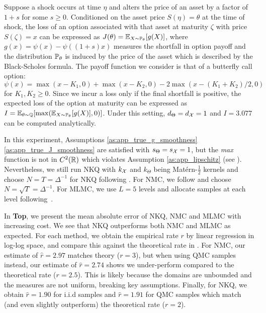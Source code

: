 Suppose a shock occurs at time $\eta$ and alters the price of an asset by a factor of $1 + s$ for some $s \geq 0$. 
Conditioned on the asset price $S(\eta)=\theta$ at the time of shock, the loss of an option associated with that asset at maturity $\zeta$ with price $S(\zeta) = x$ can be expressed as $J(\theta) = \operatorname{\mathbb{E}}_{X \sim \mathbb{P}_\theta}[g(X)]$, where $g(x) = \psi(x) - \psi((1+s)x)$ measures the shortfall in option payoff and the distribution $\mathbb{P}_\theta$ is induced by the price of the asset which is described by the Black-Scholes formula. 
The payoff function we consider is that of a butterfly call option: $\psi(x) = \max (x-K_1, 0) + \max (x - K_2, 0) - 2\max (x - (K_1 + K_2)/2, 0)$ for $K_1,K_2\geq 0$.
Since we incur a loss only if the final shortfall is positive, the expected loss of the option at maturity can be expressed as $I = \operatorname{\mathbb{E}}_{\theta \sim \mathbb{Q}} [ \max( \operatorname{\mathbb{E}}_{X \sim \mathbb{P}_\theta}[g(X)], 0) ]$. 
Under this setting, $d_\Theta=d_{\mathcal{X}}=1$ and $I= 3.077$ can be computed analytically.

In this experiment, Assumptions \ref{as:app_true_g_smoothness}\ref{as:app_true_J_smoothness} are satisfied with $s_\Theta=s_{\mathcal{X}}=1$, but the \textit{max} function is not in $C^2(\mathbb{R})$ which violates Assumption \ref{as:app_lipschitz} (see ).
Nevertheless, we still run NKQ with $k_{\mathcal{X}}$ and $k_\Theta$ being Mat\'{e}rn-$\frac{1}{2}$ kernels and choose $N=T=\Delta^{-1}$ for NKQ following .
For NMC, we follow \citet{Gordy2010} and choose $N = \sqrt{T} =\Delta^{-1}$. For MLMC, we use $L=5$ levels and allocate samples at each level following~\citet{giles2019decision}. 

In  \textbf{Top}, we present the mean absolute error of NKQ, NMC and MLMC with increasing cost. 
We see that NKQ outperforms both NMC and MLMC as expected.
For each method, we obtain the empirical rate $r$ by linear regression in log-log space, and compare this against the theoretical rate in . For NMC, our estimate of $\hat{r}=2.97$ matches theory ($r=3$), but when using QMC samples instead, our estimate of $\hat{r} = 2.74$ shows we under-perform compared to the theoretical rate ($r=2.5$). This is likely because the domains are unbounded and the measures are not uniform, breaking key assumptions. 
Finally, for NKQ, we obtain $\hat{r}=1.90$ for i.i.d samples and $\hat{r}=1.91$ for QMC samples which match (and even slightly outperform) the theoretical rate ($r=2$). 



